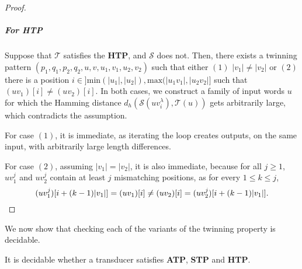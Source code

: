 \documentclass[a4paper,UKenglish,cleveref, autoref, thm-restate,authorcolumns, colorlinks]{lipics-v2021}
\newcommand\calS{\mathcal{S}}
\newcommand\calT{\mathcal{T}}
\newcommand{\ATP}[0]{\textbf{ATP}}
\newcommand{\STP}[0]{\textbf{STP}}
\newcommand{\HTP}[0]{\textbf{HTP}}
\begin{document}
\begin{proof}
\subparagraph*{For HTP} 
Suppose that $\calT$ satisfies the \HTP, and $\calS$ does not. Then, there exists a twinning pattern $(p_1,q_1,p_2,q_2,u,v,u_1,v_1,u_2,v_2)$
such that either
$(1)$ $|v_1|\neq |v_2|$ or
$(2)$ there is a position $i\in ]\text{min}(|u_1|,|u_2|), \text{max}(|u_1v_1|,|u_2v_2|]$ such that $(uv_1)[i]\neq (uv_2)[i]$.
In both cases,
we construct a family of input words $u$ for which the Hamming distance $d_h(\calS(uv_i^\lambda), \calT(u))$ gets arbitrarily large,
which contradicts the assumption. 

For case $(1)$, it is immediate, as iterating the loop creates outputs, on the same input, with arbitrarily large length differences. 


For case $(2)$, assuming $|v_1|=|v_2|$, it is also immediate, because for all $j\geq 1$, $uv_1^j$ and $uv_2^j$ contain at least $j$ mismatching positions,
as for every $1 \leq k \leq j$,
\[
(uv_1^j)[i+(k-1)|v_1|] = (uv_1)[i] \neq (uv_2)[i]=(uv_2^j)[i+(k-1)|v_1|].\qedhere
\]
\end{proof}

We now show that checking each of the variants of the twinning property is decidable.
\begin{lemma}\label{lem:decideTPs}
    It is decidable whether a transducer satisfies \ATP{}, \STP{} and \HTP{}.
\end{lemma}
\end{document}

